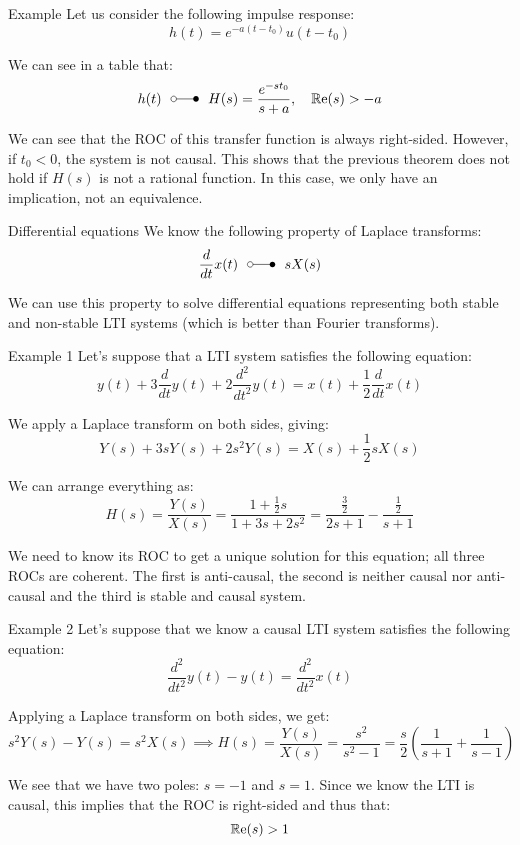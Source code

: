 \documentclass[a4paper]{article}
\begin{document}
\begin{parag}{Example}
    Let us consider the following impulse response: 
    \[h\left(t\right) = e^{-a\left(t - t_0\right)} u\left(t - t_0\right)\]
    
    We can see in a table that: 
    \[h\left(t\right) \laplacepair H\left(s\right) = \frac{e^{-s t_0}}{s + a}, \mathspace \cre\left(s\right) > -a\]
    
    We can see that the ROC of this transfer function is always right-sided. However, if $t_0 < 0$, the system is not causal. This shows that the previous theorem does not hold if $H\left(s\right)$ is not a rational function. In this case, we only have an implication, not an equivalence.
\end{parag}

\begin{parag}{Differential equations}
    We know the following property of Laplace transforms: 
    \[\frac{d}{dt} x\left(t\right) \laplacepair sX\left(s\right)\]
    
    We can  use this property to solve differential equations representing both stable and non-stable LTI systems (which is better than Fourier transforms).
\end{parag}

\begin{parag}{Example 1}
    Let's suppose that a LTI system satisfies the following equation: 
    \[y\left(t\right) + 3 \frac{d}{dt}y\left(t\right) + 2\frac{d^2}{dt^2}y\left(t\right) = x\left(t\right) + \frac{1}{2} \frac{d}{dt} x\left(t\right)\]
    
    We apply a Laplace transform on both sides, giving: 
    \[Y\left(s\right) + 3sY\left(s\right) + 2s^2 Y\left(s\right) = X\left(s\right) + \frac{1}{2} s X\left(s\right)\]
    
    We can arrange everything as: 
    \[H\left(s\right) = \frac{Y\left(s\right)}{X\left(s\right)} = \frac{1 + \frac{1}{2}s}{1 + 3s + 2s^2} = \frac{\frac{3}{2}}{2s + 1} - \frac{\frac{1}{2}}{s + 1}\]
    
    We need to know its ROC to get a unique solution for this equation; all three ROCs are coherent. The first is anti-causal, the second is neither causal nor anti-causal and the third is stable and causal system. 
\end{parag}

\begin{parag}{Example 2}
    Let's suppose that we know a causal LTI system satisfies the following equation: 
    \[\frac{d^2}{dt^2}y\left(t\right) - y\left(t\right) = \frac{d^2}{dt^2} x\left(t\right)\]
    
    Applying a Laplace transform on both sides, we get: 
    \[s^2 Y\left(s\right)-  Y\left(s\right) = s^2 X\left(s\right) \implies H\left(s\right) = \frac{Y\left(s\right)}{X\left(s\right)} = \frac{s^2}{s^2 - 1} = \frac{s}{2}\left(\frac{1}{s+1} + \frac{1}{s-1}\right)\]
    
    We see that we have two poles: $s = -1$ and $s = 1$. Since we know the LTI is causal, this implies that the ROC is right-sided and thus that: 
    \[\cre\left(s\right) > 1\]
\end{parag}
\end{document}
